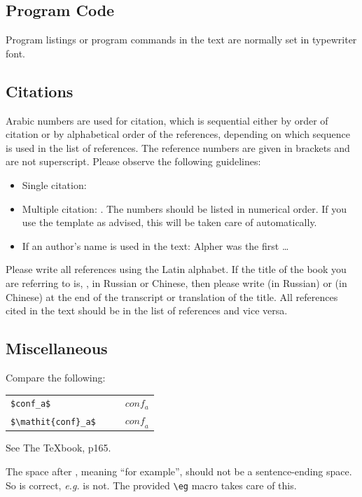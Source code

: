 \documentclass[runningheads]{llncs}
\begin{document}
\subsection{Program Code}
Program listings or program commands in the text are normally set in typewriter font.


\subsection{Citations}
Arabic numbers are used for citation, which is sequential either by order of citation or by alphabetical order of the references, depending on which sequence is used in the list of references. 
The reference numbers are given in brackets and are not superscript.
Please observe the following guidelines:
\begin{itemize}
\item Single citation: \cite{Authors14}
\item Multiple citation: \cite{Alpher02,Alpher03,Alpher05,Authors14b,Authors14}. 
  The numbers should be listed in numerical order.
  If you use the template as advised, this will be taken care of automatically.
\item If an author's name is used in the text: Alpher \cite{Alpher02} was the first \ldots
\end{itemize}
Please write all references using the Latin alphabet. If the title of the book you are referring to is, \eg, in Russian or Chinese, then please write (in Russian) or (in Chinese) at the end of the transcript or translation of the title.
All references cited in the text should be in the list of references and vice versa.


\subsection{Miscellaneous}
Compare the following:
\begin{center}
  \begin{tabular}{ll}
    \verb'$conf_a$'          & $\qquad conf_a$ \\
    \verb'$\mathit{conf}_a$' & $\qquad \mathit{conf}_a$
  \end{tabular}
\end{center}
See The \TeX book, p165.

The space after \eg, meaning ``for example'', should not be a sentence-ending space.
So \eg is correct, {\em e.g.} is not.
The provided \verb'\eg' macro takes care of this.
\end{document}
